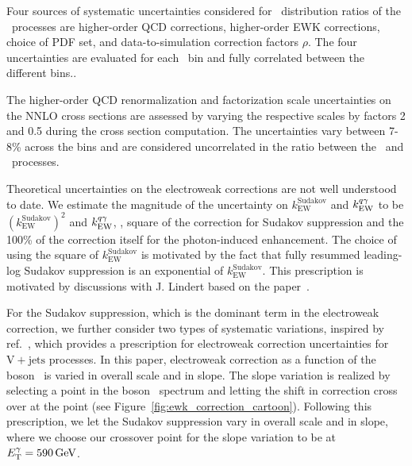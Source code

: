 Four sources of systematic uncertainties considered for \ETg\ distribution ratios of the \vg\ processes are higher-order QCD corrections, higher-order EWK corrections, choice of PDF set, and data-to-simulation correction factors $\rho$. 
The four uncertainties are evaluated for each \ETg\ bin and fully correlated between the different bins.. 

The higher-order QCD renormalization and factorization scale uncertainties on the NNLO cross sections are assessed by varying the respective scales by factors 2 and 0.5 during the cross section computation. 
The uncertainties vary between 7-8\% across the bins and are considered uncorrelated in the ratio between the \zinvg\ and \wlng\ processes.

Theoretical uncertainties on the electroweak corrections are not well understood to date.  
We estimate the magnitude of the uncertainty on $k_{\text{EW}}^{\text{Sudakov}}$ and $k_{\text{EW}}^{{q}\gamma}$ to be $\left(k_{\text{EW}}^{\text{Sudakov}}\right)^2$ and $k_{\text{EW}}^{{q}\gamma}$, \ie, square of the correction for Sudakov suppression and the 100\% of the correction itself for the photon-induced enhancement. 
The choice of using the square of $k_{\text{EW}}^{\text{Sudakov}}$ is motivated by the fact that fully resummed leading-log Sudakov suppression is an exponential of $k_{\text{EW}}^{\text{Sudakov}}$.
This prescription is motivated by discussions with J. Lindert based on the paper~\cite{}.

For the Sudakov suppression, which is the dominant term in the electroweak correction, we further consider two types of systematic variations, inspired by ref.~\cite{Lindert:2017olm}, which provides a prescription for electroweak correction uncertainties for $\mathrm{V}+\text{jets}$ processes. 
In this paper, electroweak correction as a function of the boson \pt\ is varied in overall scale and in slope. 
The slope variation is realized by selecting a point in the boson \pt\ spectrum and letting the shift in correction cross over at the point (see Figure~\ref{fig:ewk_correction_cartoon}). 
Following this prescription, we let the Sudakov suppression vary in overall scale and in slope, where we choose our crossover point for the slope variation to be at $E_{\mathrm{T}}^{\gamma}=590\,\text{Ge\hspace{-.08em}V}$.

